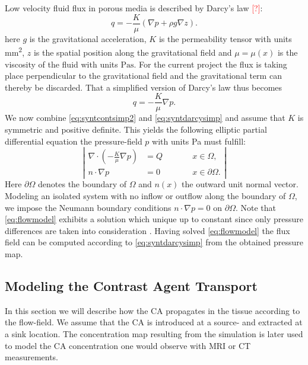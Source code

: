 \documentclass[paper=a4, fontsize=12pt,parskip=half,headings=small]{scrartcl}
\newcommand{\missingsource}{\textcolor{red}{[?]}}
\begin{document}
	Low velocity fluid flux in porous media is described by Darcy's law \missingsource:
	\[
		q = -\frac{K}{\mu} \left( \nabla p + \rho g  \nabla z \right).
	\]
	here $g$ is the gravitational acceleration, $K$ is the permeability tensor with units \si{\square\milli\meter}, $z$ is the spatial position along the gravitational field and $\mu = \mu(x)$ is the viscosity of the fluid with units $\si{\pascal\second}$.
	For the current project the flux is taking place perpendicular to the gravitational field and the gravitational term can thereby be discarded.
	That a simplified version of Darcy's law thus becomes
	\begin{equation}
		q = -\frac{K}{\mu} \nabla p.
		\label{eq:syntdarcysimp}
	\end{equation}
	We now combine \eqref{eq:syntcontsimp2} and \eqref{eq:syntdarcysimp} and assume that $K$ is symmetric and positive definite.
	This yields the following elliptic partial differential equation the pressure-field $p$ with units \si{\pascal} must fulfill:
	\begin{equation}
		\left\vert
		\begin{alignedat}{2}
			\nabla \cdot \left( -\frac{K}{\mu} \nabla p \right) &= Q  \qquad &&x \in \Omega, \\
			n \cdot \nabla p &=0 &&x \in \partial \Omega.
		\end{alignedat}
		\right\vert
		\label{eq:flowmodel}
	\end{equation}
	Here $\partial \Omega$ denotes the boundary of $\Omega$ and $n(x)$ the outward unit normal vector. 
	Modeling an isolated system with no inflow or outflow along the boundary of $\Omega$, we impose the Neumann boundary conditions $n \cdot \nabla p = 0$ on $\partial \Omega$.
	Note that \eqref{eq:flowmodel} exhibits a solution which unique up to constant since only pressure differences are taken into consideration \cite{evans98}.
	Having solved \eqref{eq:flowmodel} the flux field can be computed according to \eqref{eq:syntdarcysimp} from the obtained pressure map. 
	
	
	\subsection{Modeling the Contrast Agent Transport}\label{sec:transport}
	In this section we will describe how the CA propagates in the tissue according to the flow-field.
	We assume that the CA is introduced at a source- and extracted at a sink location.
	The concentration map resulting from the simulation is later used to model the CA concentration one would observe with MRI or CT measurements.
	
\end{document}
